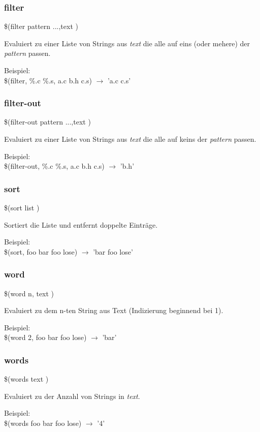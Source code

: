 \begin{frame}
	\frametitle{filter}
	\begin{Large}\$(filter pattern ...,text )\end{Large}

    \bigskip
	Evaluiert zu einer Liste von Strings aus \textit{text} die alle auf eins 
   (oder mehere) der \textit{pattern} passen.

    \bigskip 
    Beispiel: \\
	\$(filter, \%.c \%.s, a.c b.h c.s) $\longrightarrow$ 'a.c c.s'
\end{frame}

\begin{frame}
	\frametitle{filter-out}
	\begin{Large}\$(filter-out pattern ...,text )\end{Large}

    \bigskip
	Evaluiert zu einer Liste von Strings aus \textit{text} die alle auf keins 
    der \textit{pattern} passen.

    \bigskip 
    Beispiel: \\
	\$(filter-out, \%.c \%.s, a.c b.h c.s) $\longrightarrow$ 'b.h'
\end{frame}

\begin{frame}
	\frametitle{sort}
	\begin{Large}\$(sort list )\end{Large}

    \bigskip
	Sortiert die Liste und entfernt doppelte Einträge.

    \bigskip 
    Beispiel: \\
	\$(sort, foo bar foo lose) $\longrightarrow$ 'bar foo lose'
\end{frame}

\begin{frame}
	\frametitle{word}
	\begin{Large}\$(word n, text )\end{Large}

    \bigskip
	Evaluiert zu dem n-ten String aus Text (Indizierung beginnend bei 1).

    \bigskip 
    Beispiel: \\
	\$(word 2, foo bar foo lose) $\longrightarrow$ 'bar'
\end{frame}

\begin{frame}
	\frametitle{words}
	\begin{Large}\$(words text )\end{Large}

    \bigskip
	Evaluiert zu der Anzahl von Strings in \textit{text}.

    \bigskip 
    Beispiel: \\
	\$(words foo bar foo lose) $\longrightarrow$ '4'
\end{frame}

